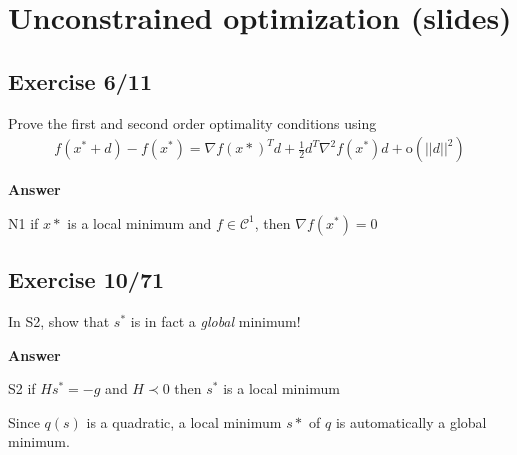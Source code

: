 \section{Unconstrained optimization (slides)}
\subsection{Exercise 6/11}
Prove the first and second order optimality conditions using
\begin{align*}
f(x^* + d) - f(x^*) = \nabla f(x*)^T d + \frac{1}{2} d^T \nabla^2 f(x^*)d + \text{o}(||d||^2)
\end{align*}

\textbf{Answer}

N1 if $x*$ is a local minimum and $f\in \mathcal{C}^1$, then $\nabla f(x^*) = 0$

\incomplete

\subsection{Exercise 10/71}
In S2, show that $s^*$ is in fact a \textit{global} minimum!

\textbf{Answer}

S2 if $Hs^* = -g$ and $H \prec 0$ then $s^*$ is a local minimum

Since $q(s)$ is a quadratic, a local minimum $s*$ of $q$ is automatically a global minimum.